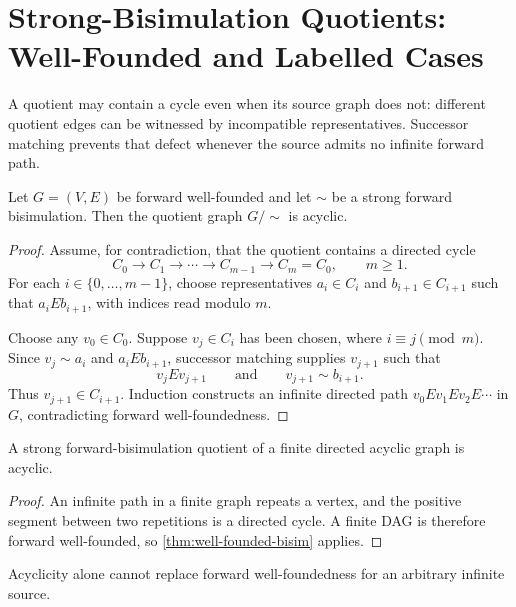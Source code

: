 \section{Strong-Bisimulation Quotients: Well-Founded and Labelled Cases}
\label{sec:bisimulation}

A quotient may contain a cycle even when its source graph does not: different
quotient edges can be witnessed by incompatible representatives.  Successor
matching prevents that defect whenever the source admits no infinite forward
path.

\begin{theorem}
\label{thm:well-founded-bisim}
Let $G=(V,E)$ be forward well-founded and let $\sim$ be a strong forward
bisimulation.  Then the quotient graph $G/{\sim}$ is acyclic.
\end{theorem}

\begin{proof}
Assume, for contradiction, that the quotient contains a directed cycle
\[
  C_0\longrightarrow C_1\longrightarrow\cdots
  \longrightarrow C_{m-1}\longrightarrow C_m=C_0,
  \qquad m\geq1.
\]
For each $i\in\{0,\ldots,m-1\}$, choose representatives
$a_i\in C_i$ and $b_{i+1}\in C_{i+1}$ such that $a_iEb_{i+1}$, with indices
read modulo $m$.

Choose any $v_0\in C_0$.  Suppose $v_j\in C_i$ has been chosen, where
$i\equiv j\pmod m$.  Since $v_j\sim a_i$ and $a_iEb_{i+1}$, successor
matching supplies $v_{j+1}$ such that
\[
  v_jEv_{j+1}
  \qquad\text{and}\qquad
  v_{j+1}\sim b_{i+1}.
\]
Thus $v_{j+1}\in C_{i+1}$.  Induction constructs an infinite directed path
$v_0Ev_1Ev_2E\cdots$ in $G$, contradicting forward well-foundedness.
\end{proof}

\begin{corollary}
\label{cor:finite-bisim}
A strong forward-bisimulation quotient of a finite directed acyclic graph is
acyclic.
\end{corollary}

\begin{proof}
An infinite path in a finite graph repeats a vertex, and the positive segment
between two repetitions is a directed cycle.  A finite DAG is therefore
forward well-founded, so \cref{thm:well-founded-bisim} applies.
\end{proof}

Acyclicity alone cannot replace forward well-foundedness for an arbitrary
infinite source.

